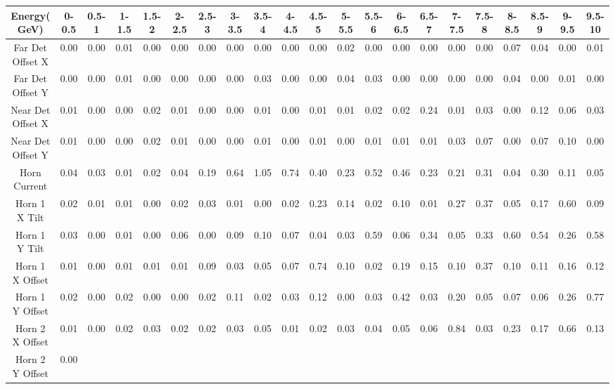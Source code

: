 \begin{sidewaystable}[ht]
\centering
\tiny
\begin{tabular}{|c | c c c c c c c c c c c c c c c c c c c c | }
\hline
Energy( GeV) & 0-0.5 & 0.5-1 & 1-1.5 & 1.5-2 & 2-2.5 & 2.5-3 & 3-3.5 & 3.5-4 & 4-4.5 & 4.5-5 & 5-5.5 & 5.5-6 & 6-6.5 & 6.5-7 & 7-7.5 & 7.5-8 & 8-8.5 & 8.5-9 & 9-9.5 & 9.5-10 \\
\hline
Far Det Offset X & 0.00
 & 0.00
 & 0.01
 & 0.00
 & 0.00
 & 0.00
 & 0.00
 & 0.00
 & 0.00
 & 0.00
 & 0.02
 & 0.00
 & 0.00
 & 0.00
 & 0.00
 & 0.00
 & 0.07
 & 0.04
 & 0.00
 & 0.01
\\
Far Det Offset Y & 0.00
 & 0.00
 & 0.01
 & 0.00
 & 0.00
 & 0.00
 & 0.00
 & 0.03
 & 0.00
 & 0.00
 & 0.04
 & 0.03
 & 0.00
 & 0.00
 & 0.00
 & 0.00
 & 0.04
 & 0.00
 & 0.01
 & 0.00
\\
Near Det Offset X & 0.01
 & 0.00
 & 0.00
 & 0.02
 & 0.01
 & 0.00
 & 0.00
 & 0.01
 & 0.00
 & 0.01
 & 0.01
 & 0.02
 & 0.02
 & 0.24
 & 0.01
 & 0.03
 & 0.00
 & 0.12
 & 0.06
 & 0.03
\\
Near Det Offset Y & 0.01
 & 0.00
 & 0.00
 & 0.02
 & 0.01
 & 0.00
 & 0.00
 & 0.01
 & 0.00
 & 0.01
 & 0.00
 & 0.01
 & 0.01
 & 0.01
 & 0.03
 & 0.07
 & 0.00
 & 0.07
 & 0.10
 & 0.00
\\
Horn Current & 0.04
 & 0.03
 & 0.01
 & 0.02
 & 0.04
 & 0.19
 & 0.64
 & 1.05
 & 0.74
 & 0.40
 & 0.23
 & 0.52
 & 0.46
 & 0.23
 & 0.21
 & 0.31
 & 0.04
 & 0.30
 & 0.11
 & 0.05
\\
Horn 1 X Tilt & 0.02
 & 0.01
 & 0.01
 & 0.00
 & 0.02
 & 0.03
 & 0.01
 & 0.00
 & 0.02
 & 0.23
 & 0.14
 & 0.02
 & 0.10
 & 0.01
 & 0.27
 & 0.37
 & 0.05
 & 0.17
 & 0.60
 & 0.09
\\
Horn 1 Y Tilt & 0.03
 & 0.00
 & 0.01
 & 0.00
 & 0.06
 & 0.00
 & 0.09
 & 0.10
 & 0.07
 & 0.04
 & 0.03
 & 0.59
 & 0.06
 & 0.34
 & 0.05
 & 0.33
 & 0.60
 & 0.54
 & 0.26
 & 0.58
\\
Horn 1 X Offset & 0.01
 & 0.00
 & 0.01
 & 0.01
 & 0.01
 & 0.09
 & 0.03
 & 0.05
 & 0.07
 & 0.74
 & 0.10
 & 0.02
 & 0.19
 & 0.15
 & 0.10
 & 0.37
 & 0.10
 & 0.11
 & 0.16
 & 0.12
\\
Horn 1 Y Offset & 0.02
 & 0.00
 & 0.02
 & 0.00
 & 0.00
 & 0.02
 & 0.11
 & 0.02
 & 0.03
 & 0.12
 & 0.00
 & 0.03
 & 0.42
 & 0.03
 & 0.20
 & 0.05
 & 0.07
 & 0.06
 & 0.26
 & 0.77
\\
Horn 2 X Offset & 0.01
 & 0.00
 & 0.02
 & 0.03
 & 0.02
 & 0.02
 & 0.03
 & 0.05
 & 0.01
 & 0.02
 & 0.03
 & 0.04
 & 0.05
 & 0.06
 & 0.84
 & 0.03
 & 0.23
 & 0.17
 & 0.66
 & 0.13
\\
Horn 2 Y Offset & 0.00

\end{tabular}
\end{sidewaystable}
